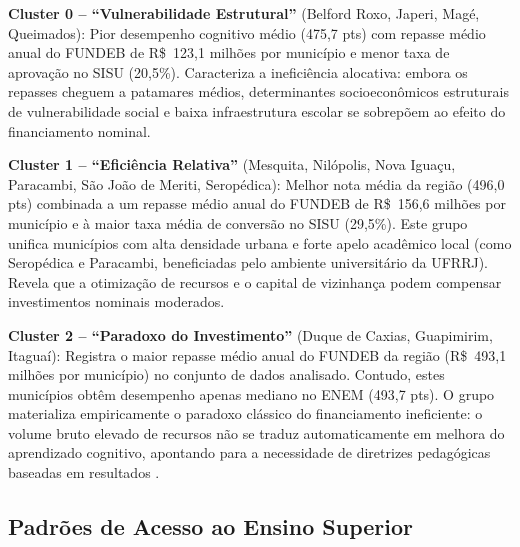 \documentclass[12pt]{article}
\begin{document}
\textbf{Cluster 0 -- ``Vulnerabilidade Estrutural''} (Belford Roxo, Japeri, Magé,
Queimados): Pior desempenho cognitivo médio (475,7 pts) com repasse médio anual do FUNDEB de R\$~123,1 milhões por município e menor taxa de aprovação no SISU (20,5\%). Caracteriza a ineficiência
alocativa: embora os repasses cheguem a patamares médios, determinantes socioeconômicos estruturais de vulnerabilidade social
e baixa infraestrutura escolar se sobrepõem ao efeito do financiamento nominal.

\textbf{Cluster 1 -- ``Eficiência Relativa''} (Mesquita, Nilópolis, Nova Iguaçu, Paracambi,
São João de Meriti, Seropédica): Melhor nota média da região (496,0 pts) combinada a um
repasse médio anual do FUNDEB de R\$~156,6 milhões por município e à maior taxa média de conversão
no SISU (29,5\%). Este grupo unifica municípios com alta densidade urbana e forte apelo acadêmico local (como Seropédica e Paracambi, beneficiadas pelo ambiente universitário da UFRRJ). Revela que a otimização de recursos e o capital de vizinhança podem compensar investimentos nominais moderados.

\textbf{Cluster 2 -- ``Paradoxo do Investimento''} (Duque de Caxias, Guapimirim,
Itaguaí): Registra o maior repasse médio anual do FUNDEB da região (R\$~493,1 milhões por município) no conjunto de dados analisado. Contudo, estes municípios obtêm desempenho apenas mediano no ENEM (493,7 pts). O grupo materializa empiricamente o paradoxo clássico do financiamento ineficiente: o volume bruto elevado de recursos não se traduz automaticamente em melhora do aprendizado cognitivo, apontando para a necessidade de diretrizes pedagógicas baseadas em resultados \cite{hanushek2003}.

\subsection{Padrões de Acesso ao Ensino Superior}
\end{document}
